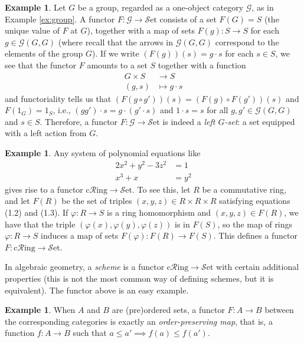 \documentclass[10pt,oneside]{book}
\def\~#1{\mathscr{#1}}
\newcommand{\Set}{\~S\mathrm{et}}
\newcommand{\cRing}{\mathrm{c}\~{R}\mathrm{ing}}
\newcommand{\vp}{\varphi}
\theoremstyle{plain}
\theoremstyle{definition}
\newtheorem{ex}[thm]{Example}
\theoremstyle{remark}
\numberwithin{equation}{section}
\numberwithin{figure}{section}
\begin{document}
\begin{ex}
    Let $G$ be a group, regarded as a one-object category $\~G$, as in Example \ref{ex:group}. A functor $F: \~G \to \Set$ consists of a set $F(G) = S$ (the unique value of $F$ at $G$), together with a map of sets $F(g): S \to S$ for each $g \in \~G(G, G)$ (where recall that the arrows in $\~G(G, G)$ correspond to the elements of the group $G$). If we write $(F(g))(s) = g \cdot s$ for each $s \in S$, we see that the functor $F$ amounts to a set $S$ together with a function
    \begin{align*}
        G \times S &\to S \\
        (g, s) &\mapsto g \cdot s
    \end{align*}
    and functoriality tells us that $(F(g\circ g'))(s) = (F(g) \circ F(g'))(s)$ and $F(1_G) = 1_S$, i.e., $(gg') \cdot s = g \cdot (g' \cdot s)$ and $1 \cdot s = s$ for all $g, g' \in \~G(G,G)$ and $s \in S$. Therefore, a functor $F: \~G \to \Set$ is indeed a \emph{left $G$-set}: a set equipped with a left action from $G$.
\end{ex}

\begin{ex}
    Any system of polynomial equations like
    \begin{align}
        2x^2 + y^2 - 3z^2 &= 1 \\
        x^3 + x &= y^2
    \end{align}
    gives rise to a functor $\cRing \to \Set$. To see this, let $R$ be a commutative ring, and let $F(R)$ be the set of triples $(x, y, z) \in R \times R \times R$ satisfying equations (1.2) and (1.3). If $\vp: R \to S$ is a ring homomorphism and $(x, y, z) \in F(R)$, we have that the triple $(\vp(x), \vp(y), \vp(z))$ is in $F(S)$, so the map of rings $\vp: R \to S$ induces a map of sets $F(\vp): F(R) \to F(S)$. This defines a functor $F: \cRing \to \Set$. 
    
    In algebraic geometry, a \emph{scheme} is a functor $\cRing \to \Set$ with certain additional properties (this is not the most common way of defining schemes, but it is equivalent). The functor above is an easy example.
\end{ex}

\begin{ex}
    When $A$ and $B$ are (pre)ordered sets, a functor $F: A \to B$ between the corresponding categories is exactly an \emph{order-preserving map}, that is, a function $f: A \to B$ such that $a \leq a' \implies f(a) \leq f(a')$.
\end{ex}
\end{document}
